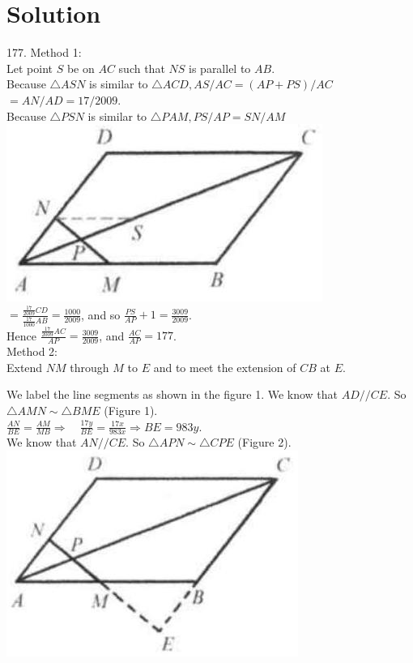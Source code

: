 \documentclass{article}
\begin{document}
\section*{Solution}
177.
Method 1:\\
Let point \(S\) be on \(A C\) such that \(N S\) is parallel to \(A B\).\\
Because \(\triangle A S N\) is similar to \(\triangle A C D, A S / A C=(A P+P S) / A C\) \(=A N / A D=17 / 2009\).\\
Because \(\triangle P S N\) is similar to \(\triangle P A M, P S / A P=S N / A M\)\\
\centering
\includegraphics[width=\textwidth]{images/141(2).jpg}\\
\(=\frac{\frac{17}{2009} C D}{\frac{17}{1000} A B}=\frac{1000}{2009}\), and so \(\frac{P S}{A P}+1=\frac{3009}{2009}\).\\
Hence \(\frac{\frac{17}{2009} A C}{A P}=\frac{3009}{2009}\), and \(\frac{A C}{A P}=177\).\\
Method 2:\\
Extend \(N M\) through \(M\) to \(E\) and to meet the extension of \(C B\) at \(E\).


We label the line segments as shown in the figure 1. We know that \(A D / / C E\). So \(\triangle A M N \sim \triangle B M E\) (Figure 1).\\
\(\frac{A N}{B E}=\frac{A M}{M B} \Rightarrow \quad \frac{17 y}{B E}=\frac{17 x}{983 x} \Rightarrow B E=983 y\).\\
We know that \(A N / / C E\). So \(\triangle A P N \sim \triangle C P E\) (Figure 2).\\
\centering
\includegraphics[width=\textwidth]{images/142(2).jpg}
\end{document}
